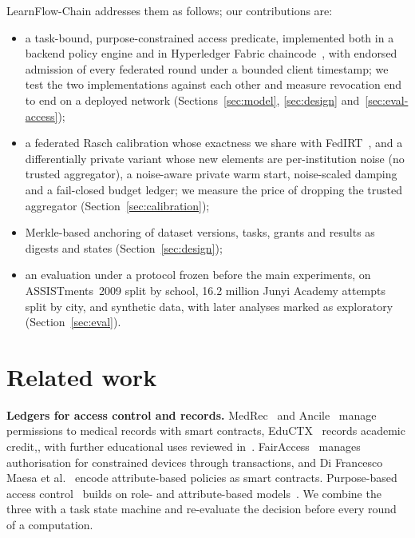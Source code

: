 \documentclass[pdflatex,iicol,sn-mathphys-num]{sn-jnl}
\theoremstyle{thmstyleone}
\newcommand{\JunyiRawRowsM}{16.2}
\begin{document}
LearnFlow-Chain addresses them as follows; our contributions are:
\begin{itemize}
\item a task-bound, purpose-constrained access predicate, implemented both in a backend policy engine and in Hyperledger Fabric chaincode~\cite{androulaki2018hyperledger}, with endorsed admission of every federated round under a bounded client timestamp; we test the two implementations against each other and measure revocation end to end on a deployed network (Sections~\ref{sec:model}, \ref{sec:design} and~\ref{sec:eval-access});
\item a federated Rasch calibration whose exactness we share with FedIRT~\cite{zhou2025federated}, and a differentially private variant whose new elements are per-institution noise (no trusted aggregator), a noise-aware private warm start, noise-scaled damping and a fail-closed budget ledger; we measure the price of dropping the trusted aggregator (Section~\ref{sec:calibration});
\item Merkle-based anchoring of dataset versions, tasks, grants and results as digests and states (Section~\ref{sec:design});
\item an evaluation under a protocol frozen before the main experiments, on ASSISTments~2009 split by school, \JunyiRawRowsM{} million Junyi Academy attempts split by city, and synthetic data, with later analyses marked as exploratory (Section~\ref{sec:eval}).
\end{itemize}

\section{Related work}\label{sec:related}

\textbf{Ledgers for access control and records.} MedRec~\cite{azaria2016medrec} and Ancile~\cite{dagher2018ancile} manage permissions to medical records with smart contracts, EduCTX~\cite{turkanovic2018eductx} records academic credit,, with further educational uses reviewed in~\cite{alammary2019blockchain}. FairAccess~\cite{ouaddah2016fairaccess} manages authorisation for constrained devices through transactions, and Di Francesco Maesa et al.~\cite{difrancescomaesa2019blockchain} encode attribute-based policies as smart contracts. Purpose-based access control~\cite{byun2008purpose} builds on role- and attribute-based models~\cite{sandhu1996role,hu2014guide}. We combine the three with a task state machine and re-evaluate the decision before every round of a computation.
\end{document}
